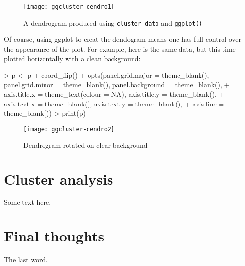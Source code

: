 \documentclass[a4paper]{article}
\newcommand{\clusterdata}{\code{cluster\_data}}
\newcommand{\code}[1]{{\tt #1}}
\begin{document}
\begin{Schunk}
\end{Schunk}

\begin{figure}
\begin{center}
{
\texttt{[image: ggcluster-dendro1]}
}
\end{center}
\caption{A dendrogram produced using \clusterdata{} and \code{ggplot()}}
\end{figure}


Of course, using ggplot to creat the dendogram means one has full control over the appearance of the plot.  For example, here is the same data, but this time plotted horizontally with a clean background:

\begin{Schunk}
\begin{Sinput}
> p <- p + coord_flip() + opts(panel.grid.major = theme_blank(), 
+     panel.grid.minor = theme_blank(), panel.background = theme_blank(), 
+     axis.title.x = theme_text(colour = NA), axis.title.y = theme_blank(), 
+     axis.text.x = theme_blank(), axis.text.y = theme_blank(), 
+     axis.line = theme_blank())
> print(p)
\end{Sinput}
\end{Schunk}

\begin{figure}
\begin{center}
{
\texttt{[image: ggcluster-dendro2]}
}
\end{center}
\caption{Dendrogram rotated on clear background}
\end{figure}


\section{Cluster analysis}

Some text here.

\section{Final thoughts}

The last word.


\end{document}
